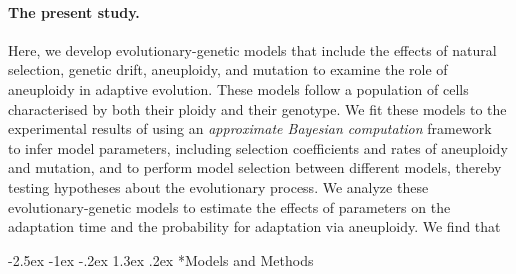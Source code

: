 \documentclass[12pt]{extarticle}
\makeatletter
\renewcommand\section{\@startsection {section}{1}{\z@}%
     {-2.5ex \@plus -1ex \@minus -.2ex}%
     {1.3ex \@plus.2ex}%
    {\Large\bfseries}}
\makeatother
\begin{document}
\paragraph*{The present study.}
Here, we develop evolutionary-genetic models that include the effects of natural selection, genetic drift, aneuploidy, and mutation to examine the role of aneuploidy in adaptive evolution.
These models follow a population of cells characterised by both their ploidy and their genotype.
We fit these models to the experimental results of \citet{Yona2012} using an \emph{approximate Bayesian computation} framework~\citep{Sisson2009} to infer model parameters, including selection coefficients and rates of aneuploidy and mutation, and to perform model selection between different models, thereby testing hypotheses about the evolutionary process. 
We analyze these evolutionary-genetic models to estimate the effects of parameters on the adaptation time and the probability for adaptation via aneuploidy.
We find that \textbf{} %

\pagebreak
\section*{Models and Methods}
\end{document}

